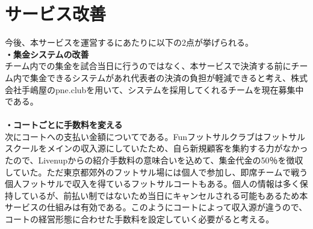 \section{サービス改善}
今後、本サービスを運営するにあたりに以下の2点が挙げられる。
\\\textbf{・集金システムの改善}
\\ チーム内での集金を試合当日に行うのではなく、本サービスで決済する前にチーム内で集金できるシステムがあれ代表者の決済の負担が軽減できると考え、株式会社手嶋屋のpne.clubを用いて、システムを採用してくれるチームを現在募集中である。
\\
\\\textbf{・コートごとに手数料を変える}
\\次にコートへの支払い金額についてである。Funフットサルクラブはフットサルスクールをメインの収入源にしていたため、自ら新規顧客を集約する力がなかったので、Livenupからの紹介手数料の意味合いを込めて、集金代金の50％を徴収していた。ただ東京都郊外のフットサル場には個人で参加し、即席チームで戦う個人フットサルで収入を得ているフットサルコートもある。個人の情報は多く保持しているが、前払い制ではないため当日にキャンセルされる可能もあるため本サービスの仕組みは有効である。このようにコートによって収入源が違うので、コートの経営形態に合わせた手数料を設定していく必要がると考える。


